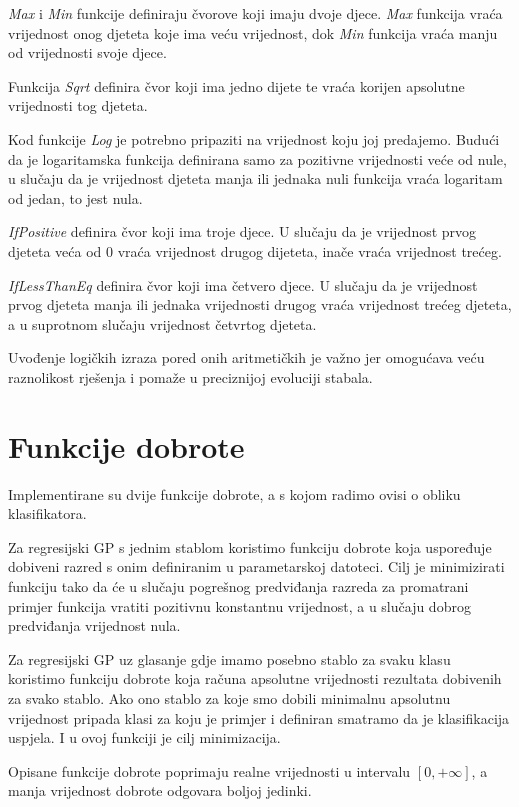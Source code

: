 \documentclass[times, utf8, zavrsni]{fer}
\begin{document}
\textit{Max} i \textit{Min} funkcije definiraju čvorove koji imaju dvoje djece. \textit{Max} funkcija vraća vrijednost onog djeteta koje ima veću vrijednost, dok \textit{Min} funkcija vraća manju od vrijednosti svoje djece.


Funkcija \textit{Sqrt} definira čvor koji ima jedno dijete te vraća korijen apsolutne vrijednosti tog djeteta.

Kod funkcije \textit{Log} je potrebno pripaziti na vrijednost koju joj predajemo. Budući da je logaritamska funkcija definirana samo za pozitivne vrijednosti veće od nule, u slučaju da je vrijednost djeteta manja ili jednaka nuli funkcija vraća logaritam od jedan, to jest nula.

\textit{IfPositive} definira čvor koji ima troje djece. U slučaju da je vrijednost prvog djeteta veća od 0 vraća vrijednost drugog dijeteta, inače vraća vrijednost trećeg.


\textit{IfLessThanEq} definira čvor koji ima četvero djece. U slučaju da je vrijednost prvog djeteta manja ili jednaka vrijednosti drugog vraća vrijednost trećeg djeteta, a u suprotnom slučaju vrijednost četvrtog djeteta.

Uvođenje logičkih izraza pored onih aritmetičkih je važno jer omogućava veću raznolikost rješenja i pomaže u preciznijoj evoluciji stabala. 

\section{Funkcije dobrote}

Implementirane su dvije funkcije dobrote, a s kojom radimo ovisi o obliku klasifikatora. 

Za regresijski GP s jednim stablom koristimo funkciju dobrote koja uspoređuje dobiveni razred s onim definiranim u parametarskoj datoteci. Cilj je minimizirati funkciju tako da će u slučaju pogrešnog predviđanja razreda za promatrani primjer funkcija vratiti pozitivnu konstantnu vrijednost, a u slučaju dobrog predviđanja vrijednost nula.

Za regresijski GP uz glasanje gdje imamo posebno stablo za svaku klasu koristimo funkciju dobrote koja računa apsolutne vrijednosti rezultata dobivenih za svako stablo. Ako ono stablo za koje smo dobili minimalnu apsolutnu vrijednost pripada klasi za koju je primjer i definiran smatramo da je klasifikacija uspjela. I u ovoj funkciji je cilj minimizacija.

Opisane funkcije dobrote poprimaju realne vrijednosti u intervalu $[0, +\infty ]$, a manja vrijednost dobrote odgovara boljoj jedinki.
\end{document}

